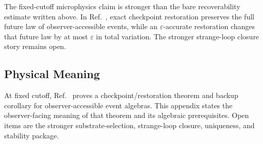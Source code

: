 The fixed-cutoff microphysics claim is stronger than the bare recoverability estimate written
above. In Ref.~\cite{ophmicrophysics}, exact checkpoint restoration preserves the full future
law of observer-accessible events, while an \(\varepsilon\)-accurate restoration changes that
future law by at most \(\varepsilon\) in total variation. The stronger strange-loop closure story
remains open.

\subsection{Physical Meaning}

At fixed cutoff, Ref.~\cite{ophmicrophysics} proves a checkpoint/restoration theorem and backup
corollary for observer-accessible event algebras. This appendix states the observer-facing meaning
of that theorem and its algebraic prerequisites. Open items are the stronger substrate-selection,
strange-loop closure, uniqueness, and stability package.


